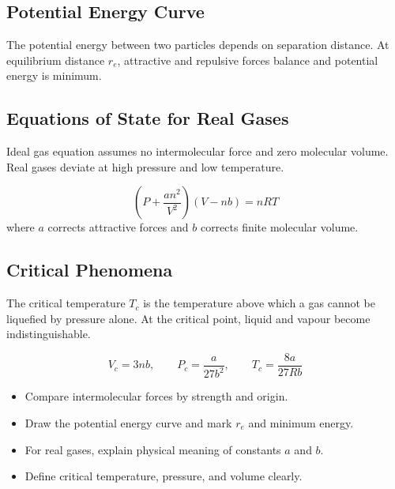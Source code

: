 \documentclass[12pt,a4paper]{article}
\begin{document}
\subsection{Potential Energy Curve}
The potential energy between two particles depends on separation distance. At equilibrium distance $r_e$, attractive and repulsive forces balance and potential energy is minimum.

\begin{tcolorbox}[tikzbox, title={Potential Energy Curve for Intermolecular Interaction}]
\centering
{}
\end{tcolorbox}

\subsection{Equations of State for Real Gases}
Ideal gas equation assumes no intermolecular force and zero molecular volume. Real gases deviate at high pressure and low temperature.

\begin{tcolorbox}[formulabox, title={Van der Waals Equation}]
\[
\left(P+\frac{a n^2}{V^2}\right)(V-nb)=nRT
\]
where $a$ corrects attractive forces and $b$ corrects finite molecular volume.
\end{tcolorbox}

\subsection{Critical Phenomena}
The critical temperature $T_c$ is the temperature above which a gas cannot be liquefied by pressure alone. At the critical point, liquid and vapour become indistinguishable.

\begin{tcolorbox}[formulabox, title={Critical Constants for a Van der Waals Gas}]
\[
V_c=3nb,\qquad P_c=\frac{a}{27b^2},\qquad T_c=\frac{8a}{27Rb}
\]
\end{tcolorbox}

\begin{tcolorbox}[exambox, title={Exam Points}]
\begin{itemize}[leftmargin=*, itemsep=2pt, topsep=2pt]
  \item Compare intermolecular forces by strength and origin.
  \item Draw the potential energy curve and mark $r_e$ and minimum energy.
  \item For real gases, explain physical meaning of constants $a$ and $b$.
  \item Define critical temperature, pressure, and volume clearly.
\end{itemize}
\end{tcolorbox}
\end{document}
